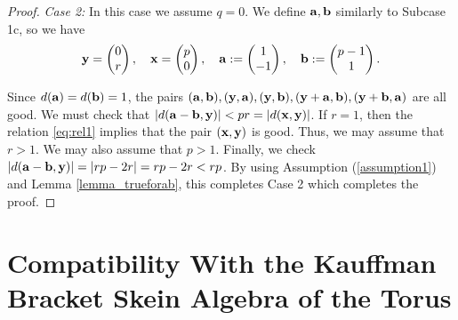 \begin{proof}
	\noindent \emph{Case 2:} In this case we assume $q=0$. We define ${\mathbf{a}}, {\mathbf{b}}$ similarly to Subcase 1c, so we have
	\[
	{\mathbf{y}} = \begin{pmatrix} 0\\r\end{pmatrix},\quad {\mathbf{x}} = \begin{pmatrix} p\\0\end{pmatrix},\quad {\mathbf{a}} := \begin{pmatrix} 1\\-1 \end{pmatrix},\quad {\mathbf{b}} := \begin{pmatrix} p-1\\ 1 \end{pmatrix}.
	\]

	Since $d({\mathbf{a}}) = d({\mathbf{b}}) = 1$, the pairs $({\mathbf{a}},{\mathbf{b}}), ({\mathbf{y}},{\mathbf{a}}), ({\mathbf{y}},{\mathbf{b}}), ({\mathbf{y}}+{\mathbf{a}},{\mathbf{b}}), ({\mathbf{y}}+{\mathbf{b}},{\mathbf{a}})$ are all good. We must check that $\lvert d({\mathbf{a}}-{\mathbf{b}},{\mathbf{y}}) \rvert < pr = \lvert d({\mathbf{x}},{\mathbf{y}}) \rvert$. If $r=1$, then the relation \eqref{eq:rel1} implies that the pair $({\mathbf{x}},{\mathbf{y}})$ is good. Thus, we may assume that $r>1$. We may also assume that $p>1$. Finally, we check $\lvert d({\mathbf{a}}-{\mathbf{b}},{\mathbf{y}}) \rvert = \lvert rp-2r \rvert = rp-2r < rp$. By using Assumption (\ref{assumption1}) and Lemma \ref{lemma_trueforab}, this completes Case 2 which completes the proof. 
\end{proof}


\section{Compatibility With the Kauffman Bracket Skein Algebra of the Torus}



